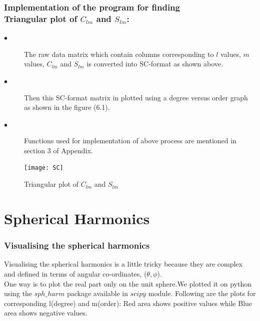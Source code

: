 \documentclass[a4paper,12pt]{report}
\begin{document}
\subsection{Implementation of the program for finding\\Triangular plot of $C_{lm}$ and $S_{lm}$:}
\begin{description}
\item[$\bullet$] The raw data matrix which contain columns corresponding to $l$ values, $m$ values, $C_{lm}$ and $S_{lm}$ is converted into SC-format as shown above.
\item[$\bullet$] Then this SC-format matrix in plotted using a degree versus order graph as shown in the figure (6.1).
\item[$\bullet$] Functions used for implementation of above process are mentioned in section 3 of Appendix.
\end{description}


\begin{figure}[!h]
	\centering
    \texttt{[image: SC]}
    \caption{Triangular plot of $C_{lm}$ and  $S_{lm}$}
    \newpage
\end{figure}

\newpage
\chapter{Spherical Harmonics}
\subsection{Visualising the spherical harmonics}
Visualising the spherical harmonics is a little tricky because they are complex and defined in terms of angular co-ordinates, ($\theta,\phi$).\\
One way is to plot the real part only on the unit sphere.We plotted it on
python using the $sph\_harm$ package available in $scipy$ module.
Following are the plots for corresponding l(degree) and m(order):
Red area shows positive values while Blue area shows negative values.
\end{document}
